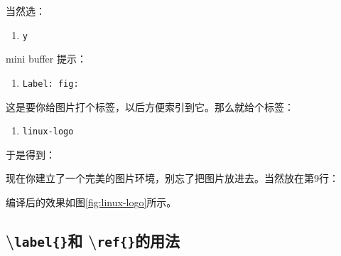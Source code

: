 当然选：

\begin{enumerate}
\item[] \texttt{y}
\end{enumerate}

mini buffer 提示：

\begin{enumerate}
\item[] \texttt{Label: fig:}
\end{enumerate}

这是要你给图片打个标签，以后方便索引到它。那么就给个标签：

\begin{enumerate}
\item[] \texttt{linux-logo}
\end{enumerate}

于是得到：

\begin{codeblock}[.9]
\end{codeblock}

现在你建立了一个完美的图片环境，别忘了把图片放进去。当然放在第9行：

\begin{codeblock}[.9]
\end{codeblock}

编译后的效果如图\ref{fig:linux-logo}所示。

\subsection{\textbackslash{}\texttt{label\{\}}和 \textbackslash{}\texttt{ref\{\}}的用法}
\label{sec:label}

